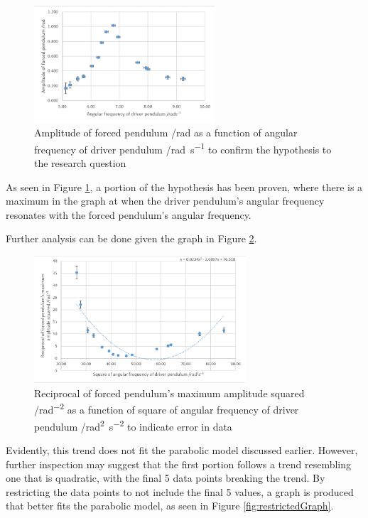 \documentclass[letterpaper, 12pt]{article}
\begin{document}
\begin{figure}[H]
    \centering
    \includegraphics[width=0.6\textwidth]{defaultGraph.png}
    \caption{Amplitude of forced pendulum /\unit{rad} as a function of angular frequency of driver pendulum /\unit{rad.s^{-1}} to confirm the hypothesis to the research question}
    \label{fig:defaultGraph}
\end{figure}

As seen in Figure \ref*{fig:defaultGraph}, a portion of the hypothesis
has been proven, where there is a maximum in the graph
at when the driver pendulum's angular frequency resonates
with the forced pendulum's angular frequency.

Further analysis can be done given the graph in Figure \ref*{fig:fullGraphOfModified}.

\begin{figure}[H]
    \centering
    \includegraphics[width=0.7\textwidth]{fullGraphOfModified.png}
    \caption{Reciprocal of forced pendulum's maximum amplitude squared /\unit{rad^{-2}} as a function of square of angular frequency of driver pendulum /\unit{rad^2.s^{-2}} to indicate error in data}
    \label{fig:fullGraphOfModified}
\end{figure}

Evidently, this trend does not fit the parabolic model discussed
earlier. However, further inspection may suggest that
the first portion follows a trend resembling one
that is quadratic, with the final 5 data points
breaking the trend. By restricting the data points
to not include the final 5 values, a
graph is produced that better fits the parabolic model,
as seen in Figure \ref*{fig:restrictedGraph}.
\end{document}

